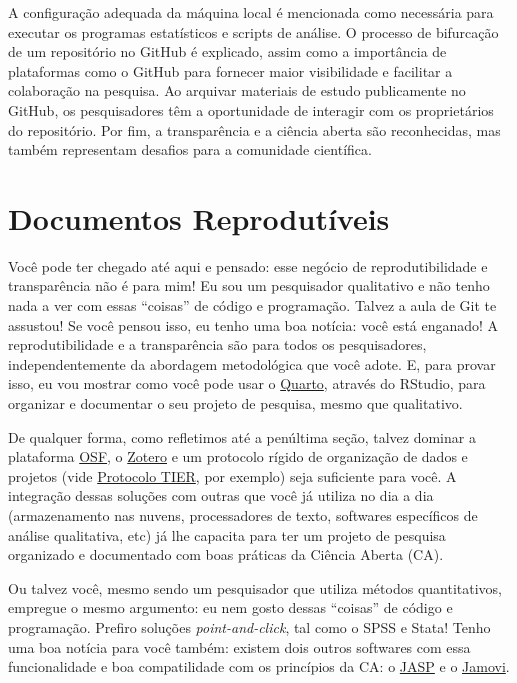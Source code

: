 \documentclass[
  a4paper,
]{book}
\begin{document}
\begin{tcolorbox}
A configuração adequada da máquina local é mencionada como necessária
para executar os programas estatísticos e scripts de análise. O processo
de bifurcação de um repositório no GitHub é explicado, assim como a
importância de plataformas como o GitHub para fornecer maior
visibilidade e facilitar a colaboração na pesquisa. Ao arquivar
materiais de estudo publicamente no GitHub, os pesquisadores têm a
oportunidade de interagir com os proprietários do repositório. Por fim,
a transparência e a ciência aberta são reconhecidas, mas também
representam desafios para a comunidade científica.

\end{tcolorbox}


\chapter{Documentos Reprodutíveis}\label{sec-quarto}

Você pode ter chegado até aqui e pensado: esse negócio de
reprodutibilidade e transparência não é para mim! Eu sou um pesquisador
qualitativo e não tenho nada a ver com essas ``coisas'' de código e
programação. Talvez a aula de Git te assustou! Se você pensou isso, eu
tenho uma boa notícia: você está enganado! A reprodutibilidade e a
transparência são para todos os pesquisadores, independentemente da
abordagem metodológica que você adote. E, para provar isso, eu vou
mostrar como você pode usar o \href{https://quarto.org/}{Quarto},
através do RStudio, para organizar e documentar o seu projeto de
pesquisa, mesmo que qualitativo.

De qualquer forma, como refletimos até a penúltima seção, talvez dominar
a plataforma \href{https://osf.io/}{OSF}, o
\href{https://www.zotero.org/}{Zotero} e um protocolo rígido de
organização de dados e projetos (vide
\href{https://www.projecttier.org/tier-protocol/protocol-4-0/}{Protocolo
TIER}, por exemplo) seja suficiente para você. A integração dessas
soluções com outras que você já utiliza no dia a dia (armazenamento nas
nuvens, processadores de texto, softwares específicos de análise
qualitativa, etc) já lhe capacita para ter um projeto de pesquisa
organizado e documentado com boas práticas da Ciência Aberta (CA).

Ou talvez você, mesmo sendo um pesquisador que utiliza métodos
quantitativos, empregue o mesmo argumento: eu nem gosto dessas
``coisas'' de código e programação. Prefiro soluções
\emph{point-and-click}, tal como o SPSS e Stata! Tenho uma boa notícia
para você também: existem dois outros softwares com essa funcionalidade
e boa compatilidade com os princípios da CA: o
\href{https://jasp-stats.org/}{JASP} e o
\href{https://www.jamovi.org/}{Jamovi}.
\end{document}
